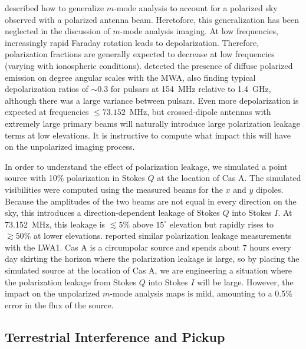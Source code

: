 \begin{bibunit}
\citet{2015PhRvD..91h3514S} described how to generalize $m$-mode analysis to account for a polarized
sky observed with a polarized antenna beam. Heretofore, this generalization has been neglected in the
discussion of $m$-mode analysis imaging.  At low frequencies, increasingly rapid Faraday rotation
leads to depolarization. Therefore, polarization fractions are generally expected to decrease at low
frequencies (varying with ionospheric conditions). \citet{2016ApJ...830...38L} detected the presence
of diffuse polarized emission on degree angular scales with the MWA, also finding typical
depolarization ratios of $\sim0.3$ for pulsars at 154~MHz relative to 1.4~GHz, although there was a
large variance between pulsars. Even more depolarization is expected at frequencies $\le
73.152$~MHz, but crossed-dipole antennas with extremely large primary beams will naturally introduce
large polarization leakage terms at low elevations.  It is instructive to compute what impact this
will have on the unpolarized imaging process.

In order to understand the effect of polarization leakage, we simulated a point source with 10\%
polarization in Stokes $Q$ at the location of Cas A.  The simulated visibilities were computed using
the measured beams for the $x$ and $y$ dipoles. Because the amplitudes of the two beams are not equal in
every direction on the sky, this introduces a direction-dependent leakage of Stokes $Q$ into
Stokes $I$. At 73.152~MHz, this leakage is $\lesssim5\%$ above $15^\circ$ elevation but rapidly
rises to $\gtrsim50\%$ at lower elevations. \citet{2015JAI.....450004O} reported similar polarization
leakage measurements with the LWA1.  Cas A is a circumpolar source and spends about 7 hours
every day skirting the horizon where the polarization leakage is large, so by placing the simulated
source at the location of Cas A, we are engineering a situation where the polarization leakage from
Stokes $Q$ into Stokes $I$ will be large. However, the impact on the unpolarized $m$-mode analysis
maps is mild, amounting to a 0.5\% error in the flux of the source.

\subsection{Terrestrial Interference and Pickup}\label{sec:rfi}


\end{bibunit}
